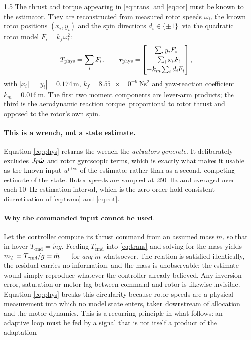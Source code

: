 \begin{spacing}{1.5}
The thrust and torque appearing in \eqref{eq:trans} and \eqref{eq:rot} must be
known to the estimator. They are reconstructed from measured rotor speeds
$\omega_i$, the known rotor positions $(x_i,y_i)$ and the spin directions
$d_i\in\{\pm1\}$, via the quadratic rotor model $F_i = k_f \omega_i^2$:
\begin{equation}
T_{\mathrm{phys}} = \sum_i F_i, \qquad
\bm{\tau}_{\mathrm{phys}} =
\begin{bmatrix}
\sum_i y_i F_i \\[2pt]
-\sum_i x_i F_i \\[2pt]
-k_m \sum_i d_i F_i
\end{bmatrix},
\label{eq:phys}
\end{equation}
with $|x_i|=|y_i|=\SI{0.174}{\meter}$,
$k_f=\SI{8.55e-6}{\newton\second\squared}$ and yaw-reaction coefficient
$k_m=\SI{0.016}{\meter}$. The first two moment components are lever-arm products;
the third is the aerodynamic reaction torque, proportional to rotor thrust and
opposed to the rotor's own spin.

\paragraph{This is a wrench, not a state estimate.} Equation \eqref{eq:phys}
returns the wrench the \emph{actuators generate}. It deliberately excludes
$J_T\dot{\bm\omega}$ and rotor gyroscopic terms, which is exactly what makes it
usable as the known input $u^{\mathrm{phys}}$ of the estimator rather than as a
second, competing estimate of the state. Rotor speeds are sampled at
\SI{250}{\hertz} and averaged over each \SI{10}{\hertz} estimation interval,
which is the zero-order-hold-consistent discretisation of \eqref{eq:trans} and
\eqref{eq:rot}.

\paragraph{Why the commanded input cannot be used.} Let the controller compute
its thrust command from an assumed mass $\tilde{m}$, so that in hover
$T_{\mathrm{cmd}} = \tilde{m} g$. Feeding $T_{\mathrm{cmd}}$ into
\eqref{eq:trans} and solving for the mass yields
$m_T = T_{\mathrm{cmd}} / g = \tilde{m}$ --- for \emph{any} $\tilde{m}$
whatsoever. The relation is satisfied identically, the residual carries no
information, and the mass is unobservable: the estimate would simply reproduce
whatever the controller already believed. Any inversion error, saturation or
motor lag between command and rotor is likewise invisible. Equation
\eqref{eq:phys} breaks this circularity because rotor speeds are a physical
measurement into which no model state enters, taken downstream of allocation and
the motor dynamics. This is a recurring principle in what follows: an adaptive
loop must be fed by a signal that is not itself a product of the adaptation.


\end{spacing}
